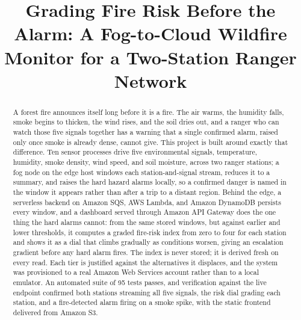 \documentclass[conference]{IEEEtran}
\begin{document}
\title{Grading Fire Risk Before the Alarm: A Fog-to-Cloud Wildfire Monitor for a Two-Station Ranger Network}

\author{
}

\maketitle

\begin{abstract}
A forest fire announces itself long before it is a fire. The air warms, the humidity falls, smoke begins to thicken, the wind rises, and the soil dries out, and a ranger who can watch those five signals together has a warning that a single confirmed alarm, raised only once smoke is already dense, cannot give. This project is built around exactly that difference. Ten sensor processes drive five environmental signals, temperature, humidity, smoke density, wind speed, and soil moisture, across two ranger stations; a fog node on the edge host windows each station-and-signal stream, reduces it to a summary, and raises the hard hazard alarms locally, so a confirmed danger is named in the window it appears rather than after a trip to a distant region. Behind the edge, a serverless backend on Amazon SQS, AWS Lambda, and Amazon DynamoDB persists every window, and a dashboard served through Amazon API Gateway does the one thing the hard alarms cannot: from the same stored windows, but against earlier and lower thresholds, it computes a graded fire-risk index from zero to four for each station and shows it as a dial that climbs gradually as conditions worsen, giving an escalation gradient before any hard alarm fires. The index is never stored; it is derived fresh on every read. Each tier is justified against the alternatives it displaces, and the system was provisioned to a real Amazon Web Services account rather than to a local emulator. An automated suite of 95 tests passes, and verification against the live endpoint confirmed both stations streaming all five signals, the risk dial grading each station, and a fire-detected alarm firing on a smoke spike, with the static frontend delivered from Amazon S3.
\end{abstract}
\end{document}
